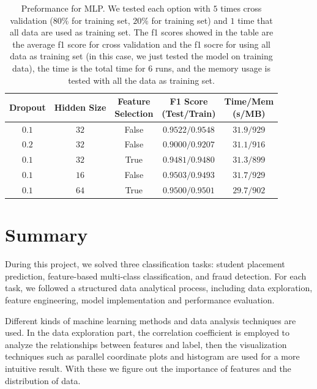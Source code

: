 \documentclass[11pt]{article}
\begin{document}
\begin{table}[H]
  \centering
  \begin{tabular}{|c|c|c|c|c|}
    \hline
    Dropout & Hidden Size & \makecell{Feature                                \\ Selection} & \makecell{F1 Score \\ (Test/Train)} & \makecell{Time/Mem \\ (s/MB)} \\
    \hline
    $0.1$   & $32$        & False             & $0.9522/0.9548$ & $31.9/929$ \\
    \hline
    $0.2$   & $32$        & False             & $0.9000/0.9207$ & $31.1/916$ \\
    \hline
    $0.1$   & $32$        & True              & $0.9481/0.9480$ & $31.3/899$ \\
    \hline
    $0.1$   & $16$        & False             & $0.9503/0.9493$ & $31.7/929$ \\
    \hline
    $0.1$   & $64$        & True              & $0.9500/0.9501$ & $29.7/902$ \\
    \hline
  \end{tabular}
  \caption{Preformance for MLP. We tested each option with $5$ times cross validation ($80\%$ for training set, $20\%$ for training set) and $1$ time that all data are used as training set. The f1 scores showed in the table are the average f1 score for cross validation and the f1 socre for using all data as training set (in this case, we just tested the model on training data), the time is the total time for $6$ runs, and the memory usage is tested with all the data as training set.}
  \label{task-3-result-2}
\end{table}

\section{Summary}

During this project, we solved three classification tasks: student placement prediction, feature-based multi-class classification, and fraud detection. For each task, we followed a structured data analytical process, including data exploration, feature engineering, model implementation and performance evaluation.

Different kinds of machine learning methods and data analysis techniques are used. In the data exploration part, the correlation coefficient is employed to analyze the relationships between features and label, then the visualization techniques such as parallel coordinate plots and histogram are used for a more intuitive result. With these we figure out the importance of features and the distribution of data.
\end{document}
